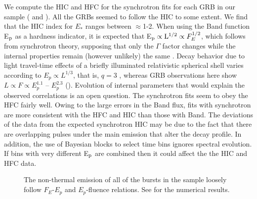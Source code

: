 We compute the HIC and HFC for the synchrotron fits for each GRB in
our sample ( and ). All the
GRBs seemed to follow the HIC to some extent. We find that the HIC
index for $E_*$ ranges between $\approx$1-2. When using the Band
function E$_{\rm p}$ as a hardness indicator, it is expected that
E$_{\rm p} \propto {\rm L}^{1/2} \propto F_{E}^{1/2}$, which follows
from synchrotron theory, supposing that only the $\Gamma$ factor
changes while the internal properties remain (however unlikely) the
same \cite{Ghisellini:2010}. Decay behavior due to light travel-time
effects of a briefly illuminated relativistic spherical shell varies
according to $E_{p}\propto L^{1/3}$, that is, $q = 3$
\cite{Kumar:2000,Dermer:2004,Genet:2009}, whereas GRB observations
here show $L\propto F \propto E_{p}^{1.1}$ -- $E_{p}^{2.3}$
().  Evolution of internal parameters that would
explain the observed correlations is an open question. The synchrotron
fits seem to obey the HFC fairly well. Owing to the large errors in
the Band flux, fits with synchrotron are more consistent with the HFC
and HIC than those with Band. The deviations of the data from the
expected synchrotron HIC may be due to the fact that there are
overlapping pulses under the main emission that alter the decay
profile. In addition, the use of Bayesian blocks to select time bins
ignores spectral evolution. If bins with very different E$_{\rm p}$
are combined then it could affect the the HIC and HFC data.

\begin{figure}[h!]

  \begin{center}
        
  \end{center}  

  \caption{The non-thermal emission of all of the bursts in the sample
    loosely follow $F_E$-$E_p$ and $E_p$-fluence relations. See 
     for the numerical results. }

  \label{fig:Epcor}

\end{figure}


